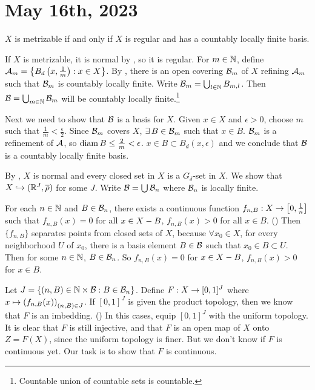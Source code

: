 \section*{May 16th, 2023}

  \(X\) is metrizable if and only if \(X\) is regular and has a countably locally finite basis.

\pf \note{\mimp} If \(X\) is metrizable, it is normal by , so it is regular. For \(m \in \mathbb{N}\), define \(\mathcal{A}_m = \left\{B_d\left( x, \frac{1}{m} \right) : x \in X\right\}\). By , there is an open covering \(\mathcal{B}_m\) of \(X\) refining \(\mathcal{A}_m\) such that \(\mathcal{B}_m\) is countably locally finite. Write \(\mathcal{B}_m = \bigcup_{l \in \mathbb{N}} B_{m, l}\). Then \(\mathcal{B} = \bigcup_{m \in \mathbb{N}} \mathcal{B}_m\) will be countably locally finite.\footnote{Countable union of countable sets is countable.}

Next we need to show that \(\mathcal{B}\) is a basis for \(X\). Given \(x \in X\) and \(\epsilon > 0\), choose \(m\) such that \(\frac{1}{m} < \frac{\epsilon}{2}\). Since \(\mathcal{B}_m\) covers \(X\), \(\exists B \in \mc{B}_m\) such that \(x \in B\). \(\mathcal{B}_m\) is a refinement of \(\mathcal{A}\), so \(\operatorname{diam} B \leq \frac{2}{m} < \epsilon\). \(x \in B \subset B_d(x, \epsilon)\) and we conclude that \(\mathcal{B}\) is a countably locally finite basis.

\note{\mimpd} By , \(X\) is normal and every closed set in \(X\) is a \(G_\delta\)-set in \(X\). We show that \(X \hookrightarrow (\mathbb{R}^J, \overline{\rho})\) for some \(J\). Write \(\mathcal{B} = \bigcup \mathcal{B}_n\) where \(\mathcal{B}_n\) is locally finite.

For each \(n \in \mathbb{N}\) and \(B \in \mathcal{B}_n\), there exists a continuous function \(f_{n, B}: X \rightarrow \left[0, \frac{1}{n}\right]\) such that \(f_{n, B}(x) = 0\) for all \(x \in X - B\), \(f_{n, B}(x) > 0\) for all \(x \in B\). () Then \(\{f_{n, B}\}\) separates points from closed sets of \(X\), because \(\forall x_0 \in X\), for every neighborhood \(U\) of \(x_0\), there is a basis element \(B \in \mathcal{B}\) such that \(x_0 \in B \subset U\). Then for some \(n \in \mathbb{N}\), \(B \in \mathcal{B}_n\). So \(f_{n, B}(x) = 0\) for \(x \in X - B\), \(f_{n, B}(x) > 0\) for \(x \in B\).

Let \(J = \{(n, B) \in \mathbb{N} \times \mathcal{B} : B \in \mathcal{B}_n\}\). Define \(F: X \rightarrow [0, 1]^J\) where \(x \mapsto \left( f_{n, B}(x) \right)_{(n, B) \in J}\). If \([0, 1]^J\) is given the product topology, then we know that \(F\) is an imbedding. () In this cases, equip \([0, 1]^J\) with the uniform topology. It is clear that \(F\) is still injective, and that \(F\) is an open map of \(X\) onto \(Z = F(X)\), since the uniform topology is finer. But we don't know if \(F\) is continuous yet. Our task is to show that \(F\) is continuous.

